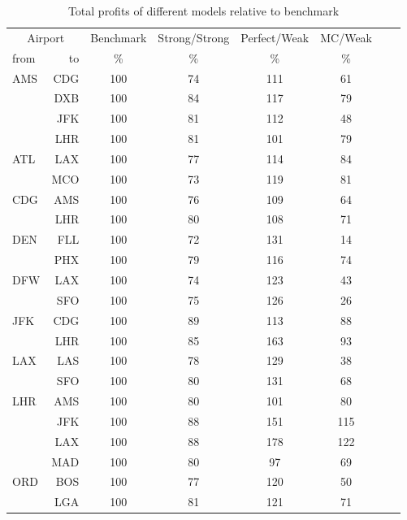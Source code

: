 \begin{table}
    \begin{center}
        \footnotesize
        \begin{tabular}{l r c c c c c c}
            \toprule
            \multicolumn{2}{c}{Airport}  & Benchmark &  Strong/Strong  &  Perfect/Weak  &  MC/Weak  \\[.4ex]
            from  &  to  &  \%  & \%  &  \%  & \%   \\
            \midrule
AMS  &  CDG &    100  &     74  &    111  &     61  \\
     &  DXB &    100  &     84  &    117  &     79  \\
     &  JFK &    100  &     81  &    112  &     48  \\
     &  LHR &    100  &     81  &    101  &     79  \\[.5ex]
ATL  &  LAX &    100  &     77  &    114  &     84  \\
     &  MCO &    100  &     73  &    119  &     81  \\[.5ex]
CDG  &  AMS &    100  &     76  &    109  &     64  \\
     &  LHR &    100  &     80  &    108  &     71  \\[.5ex]
DEN  &  FLL &    100  &     72  &    131  &     14  \\
     &  PHX &    100  &     79  &    116  &     74  \\[.5ex]
DFW  &  LAX &    100  &     74  &    123  &     43  \\
     &  SFO &    100  &     75  &    126  &     26  \\[.5ex]
JFK  &  CDG &    100  &     89  &    113  &     88  \\
     &  LHR &    100  &     85  &    163  &     93  \\[.5ex]
LAX  &  LAS &    100  &     78  &    129  &     38  \\
     &  SFO &    100  &     80  &    131  &     68  \\[.5ex]
LHR  &  AMS &    100  &     80  &    101  &     80  \\
     &  JFK &    100  &     88  &    151  &    115  \\
     &  LAX &    100  &     88  &    178  &    122  \\
     &  MAD &    100  &     80  &     97  &     69  \\[.5ex]
ORD  &  BOS &    100  &     77  &    120  &     50  \\
     &  LGA &    100  &     81  &    121  &     71  \\
            \bottomrule
        \end{tabular}
        \caption{Total profits of different models relative to benchmark}
        \label{tbl:resultsRelativeBenchmark}
    \end{center}
\end{table}


